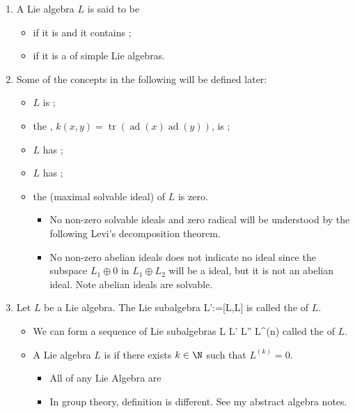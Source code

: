 \documentclass{article}
\begin{document}
\begin{enumerate}
\item {}
A Lie algebra $L$ is said to be 
\begin{itemize}
    \item {} if it is  and it contains ;
\item {} if it is a  of simple Lie algebras.
\end{itemize}
\item {} Some of the concepts in the following will be defined later:
\begin{itemize}
    \item  $L$ is ;
    \item the , $k(x, y)=\operatorname{tr}(\operatorname{ad}(x) \operatorname{ad}(y))$, is ;
    \item $L$ has ;
    \item  $L$ has ;
    \item  the  (maximal solvable ideal) of $L$ is zero.
    \begin{itemize}[$\ast$]
        \item  {No non-zero solvable ideals} and zero radical will be understood by the following Levi’s decomposition theorem.
        \item No non-zero abelian ideals does not indicate no ideal since the subspace $L_1\oplus 0$ in $L_1\oplus L_2$ will be a ideal, but it is not an abelian ideal. Note abelian ideals  are solvable.
    \end{itemize}
\end{itemize}
\item {}
Let $L$ be a Lie algebra. The Lie subalgebra
\bse
L':=[L,L]
\ese
is called the  of $L$.

\begin{itemize}
    \item {} We can form a sequence of Lie subalgebras
\bse
L \supseteq L' \supseteq L'' \supseteq \cdots \supseteq L^{(n)} \supseteq \cdots
\ese
called the  of $L$.
\item {} A Lie algebra $L$ is  if there exists $k\in \N$ such that $L^{(k)}=0$.
\begin{itemize}[$\ast$]
    \item All  of any Lie Algebra are 
    \item In group theory,  definition is different. See my abstract algebra notes.
\end{itemize}
\end{itemize}


\end{enumerate}
\end{document}
